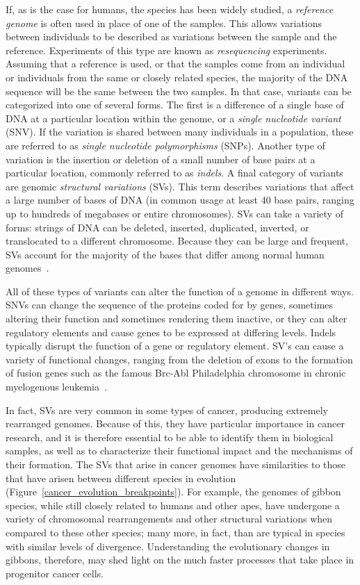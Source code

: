 If, as is the case for humans, the species has been widely studied, a \emph{reference genome} is often used in place of one of the samples. This allows variations between individuals to be described as variations between the sample and the reference. Experiments of this type are known as \emph{resequencing} experiments. Assuming that a reference is used, or that the samples come from an individual or individuals from the same or closely related species, the majority of the DNA sequence will be the same between the two samples. In that case, variants can be categorized into one of several forms. The first is a difference of a single base of DNA at a particular location within the genome, or a \emph{single nucleotide variant} (SNV). If the variation is shared between many individuals in a population, these are referred to as \emph{single nucleotide polymorphisms} (SNPs). Another type of variation is the insertion or deletion of a small number of base pairs at a particular location, commonly referred to as \emph{indels}. A final category of variants are genomic \emph{structural variations} (SVs). This term describes variations that affect a large number of bases of DNA (in common usage at least 40 base pairs, ranging up to hundreds of megabases or entire chromosomes). SVs can take a variety of forms: strings of DNA can be deleted, inserted, duplicated, inverted, or translocated to a different chromosome. Because they can be large and frequent, SVs account for the majority of the bases that differ among normal human genomes~\cite{Mills:2011p1611, Conrad:2010ja}.

All of these types of variants can alter the function of a genome in different ways. SNVs can change the sequence of the proteins coded for by genes, sometimes altering their function and sometimes rendering them inactive, or they can alter regulatory elements and cause genes to be expressed at differing levels. Indels typically disrupt the function of a gene or regulatory element. SV's can cause a variety of functional changes, ranging from the deletion of exons to the formation of fusion genes such as the famous Brc-Abl Philadelphia chromosome in chronic myelogenous leukemia~\cite{Kurzrock:2003bz}. 

In fact, SVs are very common in some types of cancer, producing extremely rearranged genomes. Because of this, they have particular importance in cancer research, and it is therefore essential to be able to identify them in biological samples, as well as to characterize their functional impact and the mechanisms of their formation. The SVs that arise in cancer genomes have similarities to those that have arisen between different species in evolution (Figure~\ref{cancer_evolution_breakpoints}). For example, the genomes of gibbon species, while still closely related to humans and other apes, have undergone a variety of chromosomal rearrangements and other structural variations when compared to these other species; many more, in fact, than are typical in species with similar levels of divergence. Understanding the evolutionary changes in gibbons, therefore, may shed light on the much faster processes that take place in progenitor cancer cells.

